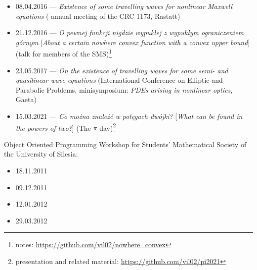 \begin{itemize}
  \item 08.04.2016 --- \textsl{Existence of some travelling waves for nonlinear Maxwell equations} ( annual meeting of the CRC 1173, Rastatt)
  \item 21.12.2016 --- \textsl{O pewnej funkcji nigdzie wypukłej z wypukłym ograniczeniem górnym} [\textsl{About a certain nowhere convex function with a convex upper bound}] (talk for members of the SMS)\footnote{notes: \url{https://github.com/vil02/nowhere_convex}}
  \item 23.05.2017 --- \textsl{On the existence of travelling waves for some semi- and quasilinear wave equations} (International Conference on Elliptic and Parabolic Problems, minisymposium: \textit{PDEs arising in nonlinear optics}, Gaeta)
  \item 15.03.2021 --- \textsl{Co można znaleźć w potęgach dwójki?} [\textsl{What can be found in the powers of two?}] (The $\pi$ day)\footnote{presentation and related material: \url{https://github.com/vil02/pi2021}}
\end{itemize}
\noindent Object Oriented Programming Workshop for Students' Mathematical Society of the University of Silesia:
\begin{itemize}
  \item 18.11.2011
  \item 09.12.2011
  \item 12.01.2012
  \item 29.03.2012
\end{itemize}
